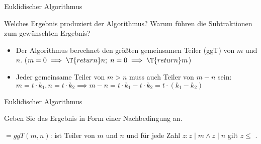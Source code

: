 \begin{frame}[fragile]{Euklidischer Algorithmus}
    \begin{exercise}[b)]
        Welches Ergebnis produziert der Algorithmus? Warum führen die Subtraktionen zum gewünschten Ergebnis?
    \end{exercise}
    \pause[]
    \begin{solve}[b)]
        \begin{itemize}
            \item Der Algorithmus berechnet den größten gemeinsamen Teiler (ggT) von $m$ und $n$. ($m=0\implies\T{return }n;\;n=0\implies\T{return }m$)
            \pause[]\item Jeder gemeinsame Teiler von $m>n$ muss auch Teiler von $m-n$ sein: $m=t\cdot k_1, n=t\cdot k_2\implies m-n=t\cdot k_1-t\cdot k_2=t\cdot\left(k_1-k_2\right)$
        \end{itemize}
    \end{solve}
\end{frame}
\addtocounter{exercise}{-1}\addtocounter{solve}{-1}%
\begin{frame}[fragile]{Euklidischer Algorithmus}
    \begin{exercise}[c)]
        Geben Sie das Ergebnis in Form einer Nachbedingung an.
    \end{exercise}
    \pause[]
    \begin{solve}[c)]
         $=ggT(m,n)$:  ist Teiler von $m$ und $n$ und für jede Zahl $z:z\mid m\wedge z\mid n$ gilt $z\leq$ .
    \end{solve}
\end{frame}